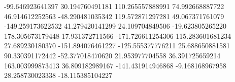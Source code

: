 -99.646923641397   30.194760491181  110.265557888991 
74.992668887722   46.914612252563  -48.290481035342
119.572871297281   49.067371761079 -149.259173622532
41.279420141299   24.109704849506  -19.623805265220
178.305673179448   17.931372711566 -171.726611254306
115.283601681234   27.689230180370 -151.894076461227 
-125.555377776211   25.688650881581   90.330391172442
-52.377018470620   21.953977704558   36.391725659214
163.003999873413   36.809182989167 -141.431914946868
-9.168168967958   28.258730023338  -18.115385104227 
  
